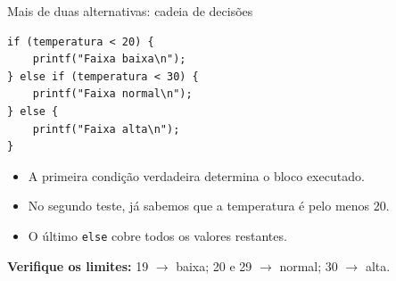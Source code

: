 \begin{frame}[fragile]{Mais de duas alternativas: cadeia de decisões}
\begin{lstlisting}
if (temperatura < 20) {
    printf("Faixa baixa\n");
} else if (temperatura < 30) {
    printf("Faixa normal\n");
} else {
    printf("Faixa alta\n");
}
\end{lstlisting}
\begin{itemize}
\item A primeira condição verdadeira determina o bloco executado.
\item No segundo teste, já sabemos que a temperatura é pelo menos 20.
\item O último \texttt{else} cobre todos os valores restantes.
\end{itemize}
\textbf{Verifique os limites:} 19 $\to$ baixa; 20 e 29 $\to$ normal; 30 $\to$ alta.
\end{frame}
